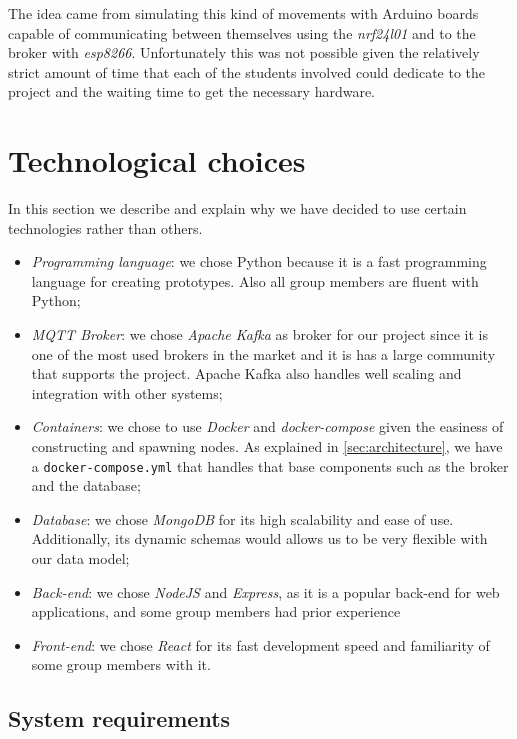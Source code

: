 \documentclass[conference]{IEEEtran}
\begin{document}
	The idea came from simulating this kind of movements with Arduino boards capable of communicating between themselves using the \textit{nrf24l01} and to the broker with \textit{esp8266}.
	Unfortunately this was not possible given the relatively strict amount of time that each of the students involved could dedicate to the project and the waiting time to get the necessary hardware.

\section{Technological choices}\label{sec:technological_choices}

	In this section we describe and explain why we have decided to use certain technologies rather than others.
	
	\begin{itemize}
		\item \textit{Programming language}: we chose Python because it is a fast programming language for creating prototypes. Also all group members are fluent with Python;
		\item \textit{MQTT Broker}: we chose \textit{Apache Kafka} as broker for our project since it is one of the most used brokers in the market and it is has a large community that supports the project. Apache Kafka also handles well scaling and integration with other systems;
		\item \textit{Containers}: we chose to use \textit{Docker} and \textit{docker-compose} given the easiness of constructing and spawning nodes. As explained in \ref{sec:architecture}, we have a \texttt{docker-compose.yml} that handles that base components such as the broker and the database;
		\item \textit{Database}: we chose \textit{MongoDB} for its high scalability and ease of use. Additionally, its dynamic schemas would allows us to be very flexible with our data model;
		\item \textit{Back-end}: we chose \textit{NodeJS} and \textit{Express}, as it is a popular back-end for web applications, and some group members had prior experience
		\item \textit{Front-end}: we chose \textit{React} for its fast development speed and familiarity of some group members with it.
	\end{itemize}

	\subsection{System requirements}
	
\end{document}
